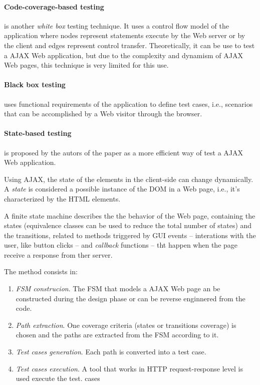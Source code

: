 \documentclass[a4paper]{article}
\begin{document}
\begin {itemize}
\paragraph{Code-coverage-based testing} 

is another \emph{white box} testing technique. 
It uses a control flow model of the application where nodes represent statements execute by the Web server or by the client and edges represent control transfer.
Theoretically, it can be use to test a AJAX Web application, but due to the complexity and dynamism of AJAX Web pages, this technique is very limited for this use.

\paragraph{Black box testing} 

uses functional requirements of the application to define test cases, i.e., scenarios that can be accomplished by a Web visitor through the browser.

\paragraph{State-based testing}

is proposed by the autors of the paper as a more efficient way of test a AJAX Web application.

Using AJAX, the state of the elements in the client-side can change dynamically.
A \emph{state} is considered a possible instance of the DOM in a Web page, i.e., it's characterized by the HTML elements.

A finite state machine describes the the behavior of the Web page, containing the states (equivalence classes can be used to reduce the total number of states) and the transitions, related to methods triggered by GUI events -- interations with the user, like button clicks -- and \emph{callback} functions -- tht happen when the page receive a response from ther server.

The method consists in: 

\begin{enumerate}
\item \emph{FSM construcion}. The FSM that models a AJAX Web page an be constructed during the design phase or can be reverse enginnered from the code.
\item \emph{Path extraction}. One coverage criteria (states or transitions coverage) is chosen and the paths are extracted from the FSM according to it.
\item \emph{Test cases generation}. Each path is converted into a test case.
\item \emph{Test cases execution}. A tool that works in HTTP request-response level is used execute the test. cases
\end{enumerate}


\end{itemize}
\end{document}
